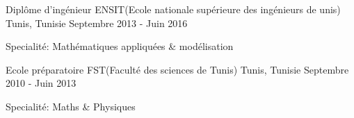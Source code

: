 

\begin{cventries}

  \cventry
    {Diplôme d'ingénieur} %
    {ENSIT(Ecole nationale supérieure des ingénieurs de unis)} %
    {Tunis, Tunisie} %
    {Septembre 2013 - Juin 2016} %
    {
      \begin{cvitems} %
				\item {Specialité: Mathématiques appliquées \& modélisation}
      \end{cvitems}
    }

	\cventry
		{Ecole préparatoire} %
		{FST(Faculté des sciences de Tunis)} %
		{Tunis, Tunisie} %
		{Septembre 2010 - Juin 2013} %
		{
			\begin{cvitems} %
				\item {Specialité: Maths \& Physiques}
			\end{cvitems}
		}


\end{cventries}
